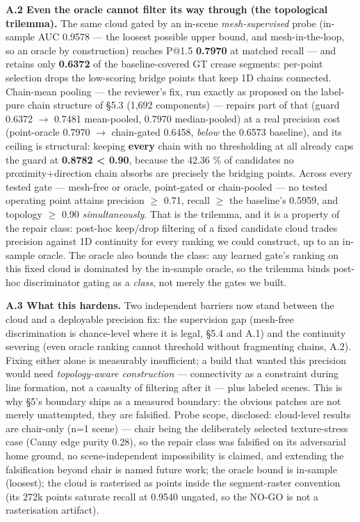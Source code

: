 \textbf{A.2 Even the oracle cannot filter its way through (the topological trilemma).} The
same cloud gated by an in-scene \emph{mesh-supervised} probe (in-sample AUC 0.9578 --- the
loosest possible upper bound, and mesh-in-the-loop, so an oracle by construction) reaches
P@1.5 \textbf{0.7970} at matched recall --- and retains only \textbf{0.6372} of the
baseline-covered GT crease segments: per-point selection drops the low-scoring bridge
points that keep 1D chains connected. Chain-mean pooling --- the reviewer's fix, run
exactly as proposed on the label-pure chain structure of \S5.3 (1,692 components) ---
repairs part of that (guard 0.6372 $\rightarrow$ 0.7481 mean-pooled, 0.7970 median-pooled) at a real
precision cost (point-oracle 0.7970 $\rightarrow$ chain-gated 0.6458, \emph{below} the 0.6573 baseline),
and its ceiling is structural: keeping \textbf{every} chain with
no thresholding at all already caps the guard at \textbf{0.8782 < 0.90}, because the 42.36 \%
of candidates no proximity+direction chain absorbs are precisely the bridging points.
Across every tested gate --- mesh-free or oracle, point-gated or chain-pooled --- no
tested operating point attains precision $\geq$ 0.71, recall $\geq$ the baseline's 0.5959, and
topology $\geq$ 0.90 \emph{simultaneously}. That is the trilemma, and it is a property of the
repair class: post-hoc keep/drop filtering of a fixed candidate cloud trades precision
against 1D continuity for every ranking we could construct, up to an in-sample oracle.
The oracle also bounds the class: any learned gate's ranking on this fixed cloud is
dominated by the in-sample oracle, so the trilemma binds post-hoc discriminator gating
as a \emph{class}, not merely the gates we built.

\textbf{A.3 What this hardens.} Two independent barriers now stand between the cloud and a
deployable precision fix: the supervision gap (mesh-free discrimination is chance-level
where it is legal, \S5.4 and A.1) and the continuity severing (even oracle ranking cannot
threshold without fragmenting chains, A.2). Fixing either alone is measurably
insufficient; a build that wanted this precision would need \emph{topology-aware
construction} --- connectivity as a constraint during line formation, not a casualty of
filtering after it --- plus labeled scenes. This is why \S5's boundary ships as a measured
boundary: the obvious patches are not merely unattempted, they are falsified. Probe
scope, disclosed: cloud-level results are chair-only (n=1 scene) --- chair being the
deliberately selected texture-stress case (Canny edge purity 0.28), so the repair class
was falsified on its adversarial home ground, no scene-independent impossibility is
claimed, and extending the falsification beyond chair is named future work; the oracle
bound is
in-sample (loosest); the cloud is rasterised as points inside the segment-raster
convention (its 272k points saturate recall at 0.9540 ungated, so the NO-GO is not a
rasterisation artifact).


